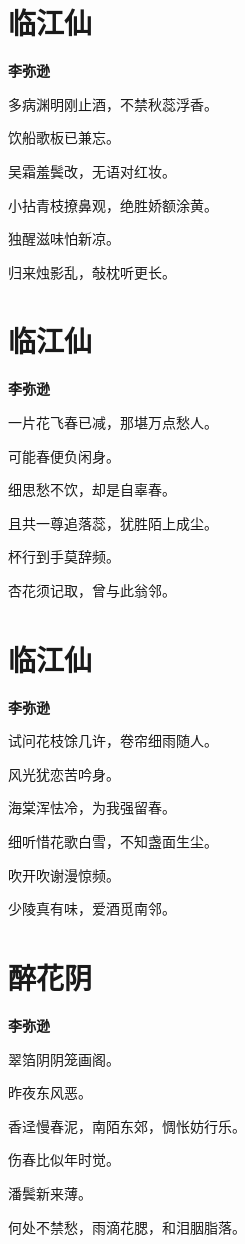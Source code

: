 \documentclass[12pt,a4paper]{ctexbook}
\begin{document}
\section{临江仙}
\textbf{李弥逊}\par\vspace{0.5em}
多病渊明刚止酒，不禁秋蕊浮香。\par
饮船歌板已兼忘。\par
吴霜羞鬓改，无语对红妆。\par
小拈青枝撩鼻观，绝胜娇额涂黄。\par
独醒滋味怕新凉。\par
归来烛影乱，敧枕听更长。\par

\section{临江仙}
\textbf{李弥逊}\par\vspace{0.5em}
一片花飞春已减，那堪万点愁人。\par
可能春便负闲身。\par
细思愁不饮，却是自辜春。\par
且共一尊追落蕊，犹胜陌上成尘。\par
杯行到手莫辞频。\par
杏花须记取，曾与此翁邻。\par

\section{临江仙}
\textbf{李弥逊}\par\vspace{0.5em}
试问花枝馀几许，卷帘细雨随人。\par
风光犹恋苦吟身。\par
海棠浑怯冷，为我强留春。\par
细听惜花歌白雪，不知盏面生尘。\par
吹开吹谢漫惊频。\par
少陵真有味，爱酒觅南邻。\par

\section{醉花阴}
\textbf{李弥逊}\par\vspace{0.5em}
翠箔阴阴笼画阁。\par
昨夜东风恶。\par
香迳慢春泥，南陌东郊，惆怅妨行乐。\par
伤春比似年时觉。\par
潘鬓新来薄。\par
何处不禁愁，雨滴花腮，和泪胭脂落。\par
\end{document}
